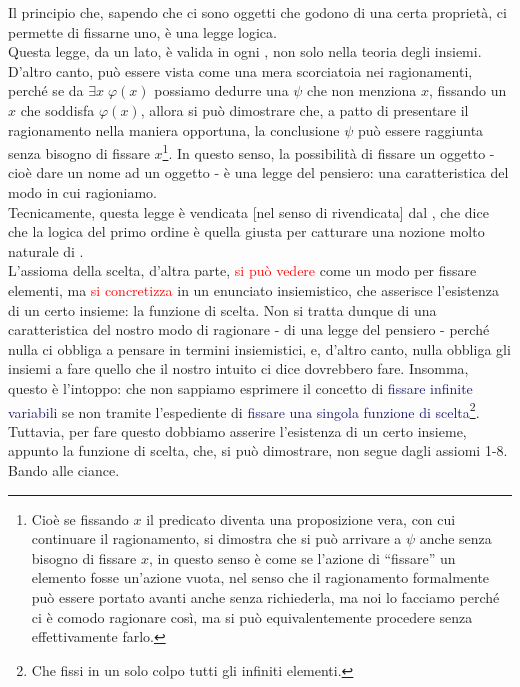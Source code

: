 Il principio che, sapendo che ci sono oggetti che godono di una certa proprietà, ci permette di fissarne uno, è una legge logica.\\
Questa legge, da un lato, è valida in ogni , non solo nella teoria degli insiemi. D'altro canto, può essere vista come una mera scorciatoia nei ragionamenti, perché se da $\exists x \; \varphi(x)$ possiamo dedurre una $\psi$ che non menziona $x$,
fissando un $x$ che soddisfa $\varphi(x)$, allora si può dimostrare che, a patto di presentare il ragionamento nella maniera opportuna, la conclusione $\psi$ può essere raggiunta senza bisogno di fissare $x$\footnote{Cioè se fissando $x$ il predicato diventa una proposizione vera, con cui continuare il ragionamento, si dimostra che si può arrivare a $\psi$ anche senza 
bisogno di fissare $x$, in questo senso è come se l'azione di ``fissare'' un elemento fosse un'azione vuota, nel senso che il ragionamento formalmente può essere portato avanti anche senza richiederla, ma noi lo facciamo perché ci è comodo ragionare così, ma si può equivalentemente procedere senza effettivamente farlo.}. In questo senso, la possibilità
di fissare un oggetto - cioè dare un nome ad un oggetto - è una legge del pensiero: una caratteristica del modo in cui ragioniamo.\\
Tecnicamente, questa legge è vendicata [nel senso di rivendicata] dal , che dice che la logica del primo ordine è quella giusta per catturare una nozione molto naturale di .\\
L'assioma della scelta, d'altra parte, \textcolor{red}{si può vedere} come un modo per fissare elementi, ma \textcolor{red}{si concretizza} in un enunciato insiemistico, che asserisce l'esistenza di un certo insieme: la funzione di scelta.
Non si tratta dunque di una caratteristica del nostro modo di ragionare - di una legge del pensiero - perché nulla ci obbliga a pensare in termini insiemistici, e, d'altro canto, nulla obbliga gli insiemi a fare quello che il nostro intuito ci dice dovrebbero fare.
Insomma, questo è l'intoppo: che non sappiamo esprimere il concetto di \textcolor{MidnightBlue}{fissare infinite variabili} se non tramite l'espediente di \textcolor{MidnightBlue}{fissare una singola funzione di scelta}\footnote{Che fissi in un solo colpo tutti gli infiniti elementi.}. Tuttavia, per fare questo dobbiamo asserire l'esistenza di un certo insieme, appunto la funzione di scelta,
che, si può dimostrare, non segue dagli assiomi 1-8. Bando alle ciance.

